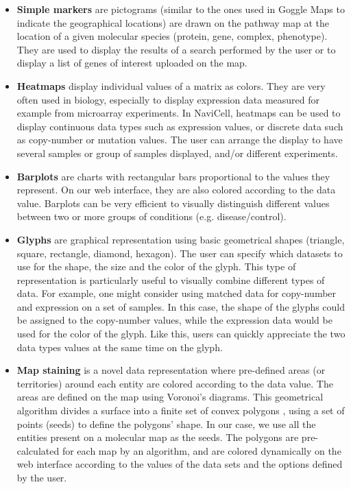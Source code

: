 \documentclass[a4,center,fleqn]{NAR}
\begin{document}
\begin{itemize}

\item \textbf{Simple markers} are pictograms (similar to the ones used in Goggle Maps
to indicate the geographical locations) are drawn on the pathway map at the location
of a given molecular species (protein, gene, complex, phenotype). They are used to display the
results of a search performed by the user or to display a list of genes of interest
uploaded on the map.

\item \textbf{Heatmaps} display individual values of a matrix as
colors. They are very often used in biology, especially to display expression
data measured for example from microarray experiments. In NaviCell, heatmaps can be used to
display continuous data types such as expression values, or discrete data such
as copy-number or mutation values. The user can arrange the display to have
several samples or group of samples displayed, and/or different experiments.

\item \textbf{Barplots} are charts with rectangular bars proportional to the values
they represent. On our web interface, they are also colored according to the
data value. Barplots can be very efficient to visually distinguish different
values between two or more groups of conditions (e.g. disease/control).

\item \textbf{Glyphs} are graphical representation using basic geometrical
shapes (triangle, square, rectangle, diamond, hexagon). The user can specify
which datasets to use for the shape, the size and the color of the glyph. This
type of representation is particularly useful to visually combine different
types of data. For example, one might consider using matched data for
copy-number and expression on a set of samples. In this case, the shape of the
glyphs could be assigned to the copy-number values, while the expression data
would be used for the color of the glyph. Like this, users can quickly
appreciate the two data types values at the same time on the glyph.

\item \textbf{Map staining} is a novel data representation where pre-defined
areas (or territories) around each entity are colored according to the data
value. The areas are defined on the map using Voronoi's diagrams. This
geometrical algorithm divides a surface into a finite set of convex polygons
\cite{aurenhammer1991voronoi}, using a set of points (seeds) to define the
polygons' shape. In our case, we use all the entities present on a molecular map
as the seeds. The polygons are pre-calculated for each map by an algorithm, and
are colored dynamically on the web interface according to the values of the data
sets and the options defined by the user.

\end{itemize}
\end{document}
